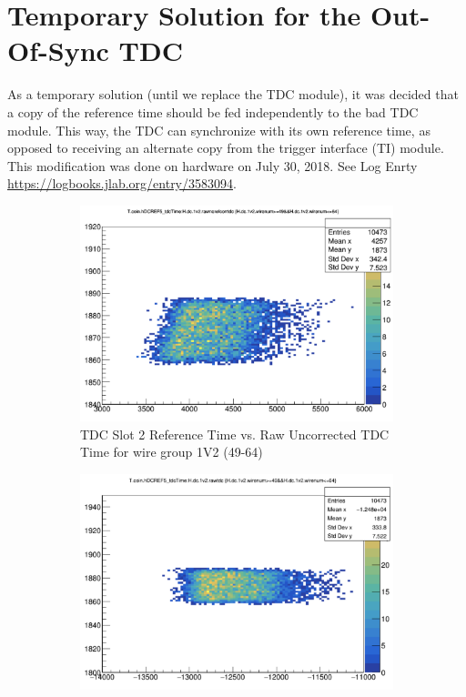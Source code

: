 \documentclass[11pt]{article}
\begin{document}
\section{Temporary Solution for the Out-Of-Sync TDC}
\indent As a temporary solution (until we replace the TDC module), it was decided that a copy of the reference time should be fed independently to the bad TDC module. This way, the TDC can synchronize with its own
reference time, as opposed to receiving an alternate copy from the trigger interface (TI) module. This modification was done on hardware on July 30, 2018. See Log Enrty \url{https://logbooks.jlab.org/entry/3583094}.

\begin{figure}[h!]
\centering
\begin{subfigure}{.5\textwidth}
  \centering
  \includegraphics[width=.8\linewidth]{hdcref5_corr.png}
  \caption{TDC Slot 2 Reference Time vs. Raw Uncorrected TDC \\Time for wire group 1V2 (49-64)}
  \label{fig:ref5_correlated}
\end{subfigure}%
\begin{subfigure}{.5\textwidth}
  \centering
  \includegraphics[width=.8\linewidth]{hdcref5_uncorr.png}

\end{subfigure}
\end{figure}
\end{document}

